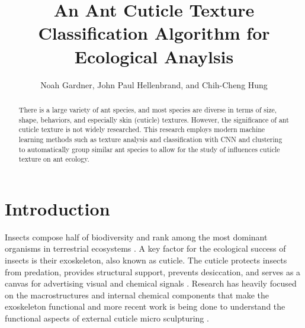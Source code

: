 \documentclass{aci}
\begin{document}
\title{An Ant Cuticle Texture Classification Algorithm for Ecological Anaylsis}

\author{%
  Noah Gardner, John Paul Hellenbrand, and Chih-Cheng
  Hung\corrauth}


\address{%
  }


\begin{abstract}
  There is a large variety of ant species, and most species are diverse in terms
  of size, shape, behaviors, and especially skin (cuticle) textures. However,
  the significance of ant cuticle texture is not widely researched. This
  research employs modern machine learning methods such as texture analysis and
  classification with CNN and clustering to automatically group similar ant
  species to allow for the study of influences cuticle texture on ant ecology.

\end{abstract}




\maketitle

\section{Introduction}
Insects compose half of biodiversity and rank among the most dominant organisms
in terrestrial ecosystems \cite{sheikh_diverse_2017}. A key factor for the
ecological success of insects is their exoskeleton, also known as cuticle. The
cuticle protects insects from predation, provides structural support, prevents
desiccation, and serves as a canvas for advertising visual and chemical signals
\cite{gullan_insects_2009}. Research has heavily focused on the macrostructures
and internal chemical components that make the exoskeleton functional and more
recent work is being done to understand the functional aspects of external
cuticle micro sculpturing \cite{muthukrishnan_insect_2020,
  gunderson_insect_1989, watson_diversity_2017}.
\end{document}
